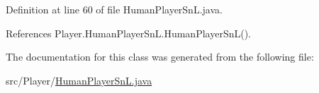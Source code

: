 Definition at line 60 of file Human\+Player\+Sn\+L.\+java.



References Player.\+Human\+Player\+Sn\+L.\+Human\+Player\+Sn\+L().



The documentation for this class was generated from the following file\+:\begin{DoxyCompactItemize}
\item 
src/\+Player/\hyperlink{_human_player_sn_l_8java}{Human\+Player\+Sn\+L.\+java}\end{DoxyCompactItemize}
